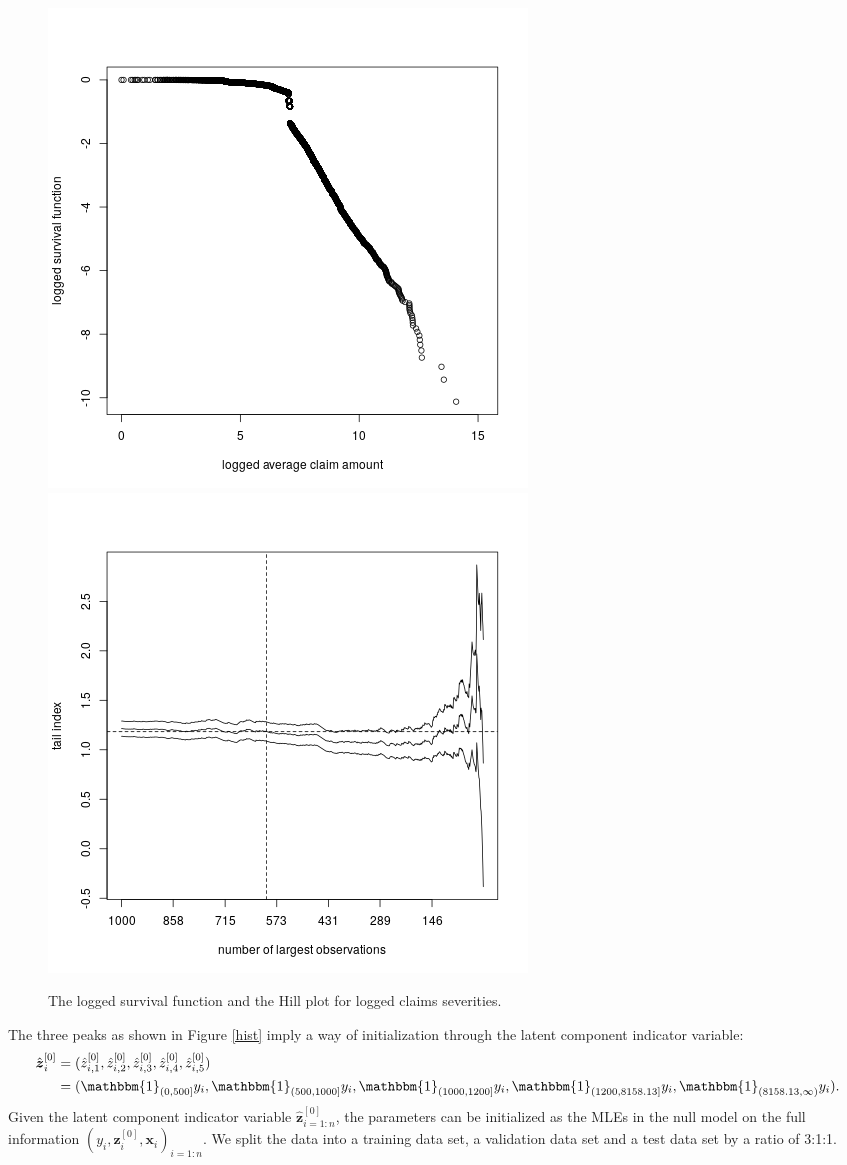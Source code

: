 \documentclass[11pt]{article}
\numberwithin{equation}{section}
\def\bx{\boldsymbol{x}}
\def\bz{\boldsymbol{z}}
\begin{document}
	
\begin{figure}[h!]
	\centering
	\includegraphics[width=0.4\linewidth]{../plots/sev/log-log.png}
	\includegraphics[width=0.4\linewidth]{../plots/sev/hill.png}
	\caption{The logged survival function and the Hill plot for logged claims severities.}\label{tail}
\end{figure}
	
The three peaks as shown in Figure \ref{hist} imply a way of initialization through the latent component indicator variable:
	\begin{equation}
		\begin{aligned}
			\hat{\bz}^{[0]}_i&=(\hat{z}^{[0]}_{i,1},\hat{z}^{[0]}_{i,2},\hat{z}^{[0]}_{i,3},\hat{z}^{[0]}_{i,4},\hat{z}^{[0]}_{i,5})\\
			&=(\mathbbm{1}_{(0,500]}y_i,\mathbbm{1}_{(500, 1000]}y_i,\mathbbm{1}_{(1000,1200]}y_i,\mathbbm{1}_{(1200,8158.13]}y_i,\mathbbm{1}_{(8158.13,\infty)}y_i).
		\end{aligned}
	\end{equation}
Given the latent component indicator variable $\hat{\bz}^{[0]}_{i=1:n}$, the parameters can be initialized as the MLEs in the null model on the full information $(y_i,\hat{\bz}_i^{[0]},\bx_i)_{i=1:n}$.
We split the data into a training data set, a validation data set and a test data set by a ratio of 3:1:1. 
	
\end{document}
